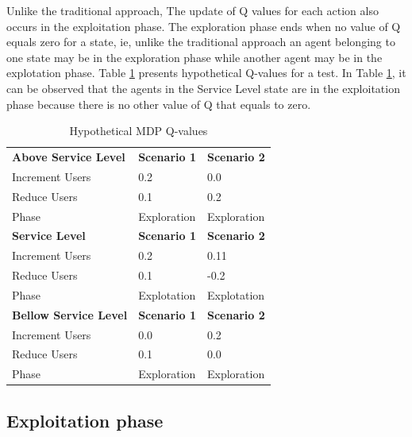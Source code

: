 \documentclass{report}
\begin{document}
Unlike the traditional approach, The update of Q values for each action also occurs in the exploitation phase. The exploration phase ends when no value of Q equals zero for a state, ie, unlike the traditional approach an agent belonging to one state may be in the exploration phase while another agent may be in the explotation phase. Table \ref{pab:mdp} presents hypothetical Q-values for a test. In Table \ref{pab:mdp}, it can be observed that the agents in the Service Level state are in the exploitation phase because there is no other value of Q that equals to zero.


\begin{table}[h]
\centering
\caption{Hypothetical MDP Q-values }
\label{pab:mdp}
\begin{tabular}{lll}
\rowcolor[HTML]{C0C0C0}
\textbf{Above Service Level}  & \textbf{Scenario 1} & \textbf{Scenario 2} \\
Increment Users               & 0.2                 & 0.0                 \\
Reduce Users                  & 0.1                 & 0.2                 \\
Phase                         & Exploration         & Exploration         \\
\rowcolor[HTML]{C0C0C0}
\textbf{Service Level}        & \textbf{Scenario 1} & \textbf{Scenario 2} \\
Increment Users               & 0.2                 & 0.11                \\
Reduce Users                  & 0.1                 & -0.2                \\
\rowcolor[HTML]{F8FF00}
Phase                         & Explotation         & Explotation         \\
\rowcolor[HTML]{C0C0C0}
\textbf{Bellow Service Level} & \textbf{Scenario 1} & \textbf{Scenario 2} \\
Increment Users               & 0.0                 & 0.2                 \\
Reduce Users                  & 0.1                 & 0.0                 \\
Phase                         & Exploration         & Exploration
\end{tabular}
\end{table}

\subsection{Exploitation phase}
\end{document}
